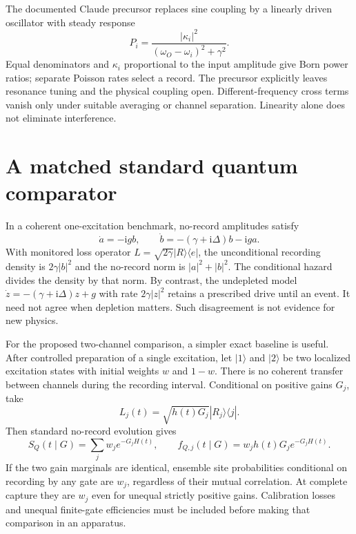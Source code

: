 \documentclass[11pt]{article}
\newcommand{\ii}{\mathrm i}
\begin{document}
The documented Claude precursor replaces sine coupling by a linearly driven oscillator with steady response
\begin{equation}
 P_i=\frac{|\kappa_i|^2}{(\omega_O-\omega_i)^2+\gamma^2}.
\end{equation}
Equal denominators and $\kappa_i$ proportional to the input amplitude give Born power ratios; separate Poisson rates select a record. The precursor explicitly leaves resonance tuning and the physical coupling open. Different-frequency cross terms vanish only under suitable averaging or channel separation. Linearity alone does not eliminate interference.

\section{A matched standard quantum comparator}\label{sec:standard}
In a coherent one-excitation benchmark, no-record amplitudes satisfy
\begin{equation}
 \dot a=-\ii g b,\qquad
 \dot b=-(\gamma+\ii\Delta)b-\ii g a.
\end{equation}
With monitored loss operator $L=\sqrt{2\gamma}|R\rangle\langle e|$, the unconditional recording density is $2\gamma|b|^2$ and the no-record norm is $|a|^2+|b|^2$. The conditional hazard divides the density by that norm. By contrast, the undepleted model $\dot z=-(\gamma+\ii\Delta)z+g$ with rate $2\gamma|z|^2$ retains a prescribed drive until an event. It need not agree when depletion matters. Such disagreement is not evidence for new physics.

For the proposed two-channel comparison, a simpler exact baseline is useful. After controlled preparation of a single excitation, let $|1\rangle$ and $|2\rangle$ be two localized excitation states with initial weights $w$ and $1-w$. There is no coherent transfer between channels during the recording interval. Conditional on positive gains $G_j$, take
\begin{equation}\label{eq:jump}
 L_j(t)=\sqrt{h(t)G_j}|R_j\rangle\langle j|.
\end{equation}
Then standard no-record evolution gives
\begin{equation}\label{eq:quantumsite}
 S_Q(t\mid G)=\sum_j w_j e^{-G_j H(t)},\qquad
 f_{Q,j}(t\mid G)=w_j h(t)G_j e^{-G_j H(t)}.
\end{equation}
If the two gain marginals are identical, ensemble site probabilities conditional on recording by any gate are $w_j$, regardless of their mutual correlation. At complete capture they are $w_j$ even for unequal strictly positive gains. Calibration losses and unequal finite-gate efficiencies must be included before making that comparison in an apparatus.
\end{document}
